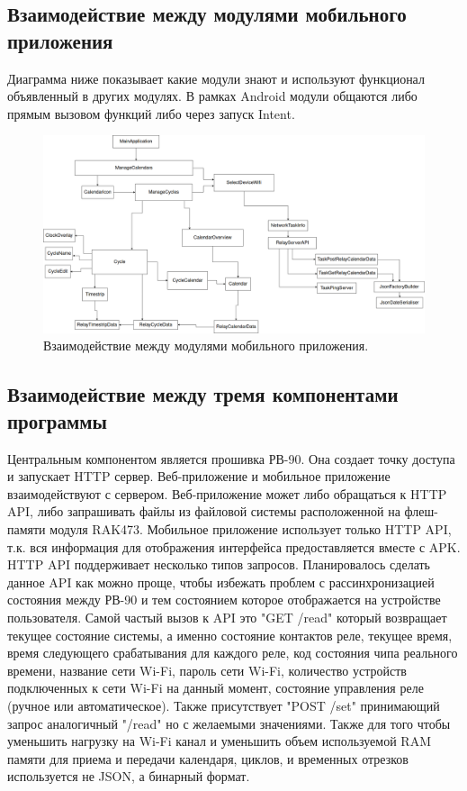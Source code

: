\newpage
\subsection{Взаимодействие между модулями мобильного приложения}
Диаграмма ниже показывает какие модули знают и используют функционал объявленный в других модулях. В рамках Android модули общаются либо прямым вызовом функций либо через запуск Intent.

\begin{figure}[h!]
    \centering
    \includegraphics[width=1.03\textwidth]{mobile_modules_hierarchy.png}
    \caption{Взаимодействие между модулями мобильного приложения.}
\end{figure}




\newpage
\subsection{Взаимодействие между тремя компонентами программы}
Центральным компонентом является прошивка РВ-90. Она создает точку доступа и запускает HTTP сервер. Веб-приложение и мобильное приложение взаимодействуют с сервером.
Веб-приложение может либо обращаться к HTTP API, либо запрашивать файлы из файловой системы расположенной на флеш-памяти модуля RAK473. Мобильное приложение использует только HTTP API, т.к. вся информация для отображения интерфейса предоставляется вместе с APK.
HTTP API поддерживает несколько типов запросов. Планировалось сделать данное API как можно проще, чтобы избежать проблем с рассинхронизацией состояния между РВ-90 и тем состоянием которое отображается на устройстве пользователя. Самой частый вызов к API это "GET /read" который возвращает текущее состояние системы, а именно состояние контактов реле, текущее время, время следующего срабатывания для каждого реле, код состояния чипа реального времени, название сети Wi-Fi, пароль сети Wi-Fi, количество устройств подключенных к сети Wi-Fi на данный момент, состояние управления реле (ручное или автоматическое). Также присутствует "POST /set" принимающий запрос аналогичный "/read" но с желаемыми значениями. Также для того чтобы уменьшить нагрузку на Wi-Fi канал и уменьшить объем используемой RAM памяти для приема и передачи календаря, циклов, и временных отрезков используется не JSON, а бинарный формат.



